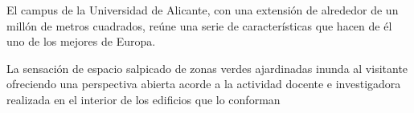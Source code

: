 \documentclass{article}
\begin{document}
El campus de la Universidad de Alicante, con una extensión de alrededor 
de un millón de metros cuadrados, reúne una serie de características que 
hacen de él uno de los mejores de Europa.

La sensación de espacio salpicado de zonas verdes ajardinadas inunda  
al visitante ofreciendo una perspectiva abierta acorde a la actividad 
docente e investigadora realizada en el interior de los edificios que 
lo conforman
\end{document}
